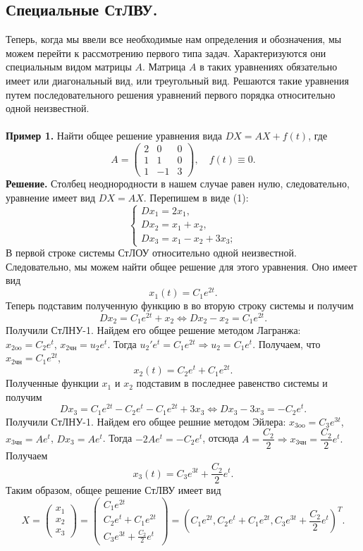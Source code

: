 \documentclass[a4paper, 12pt]{article}
\begin{document}
	\subsection*{Специальные СтЛВУ.}
	Теперь, когда мы ввели все необходимые нам определения и обозначения, мы можем перейти к рассмотрению первого типа задач. Характеризуются они специальным видом матрицы $A$. Матрица $A$ в таких уравнениях обязательно имеет или диагональный вид, или треугольный вид. Решаются такие уравнения путем последовательного решения уравнений первого порядка относительно одной неизвестной.\\\\
	\textbf{Пример 1.} Найти общее решение уравнения вида $DX = AX + f(t)$, где $$A = \begin{pmatrix}
		2 & 0 & 0\\
		1 & 1 & 0\\
		1 & -1 & 3
	\end{pmatrix},\quad f(t)\equiv 0.$$
	\textbf{Решение.} Столбец неоднородности в нашем случае равен нулю, следовательно, уравнение имеет вид $DX = AX$. Перепишем в виде (1):
	$$\begin{cases}
		Dx_1 = 2x_1,\\
		Dx_2 = x_1 + x_2,\\
		Dx_3 = x_1 - x_2 + 3x_3;
	\end{cases}$$
	В первой строке системы СтЛОУ относительно одной неизвестной. Следовательно, мы можем найти общее решение для этого уравнения. Оно имеет вид $$x_1(t) = C_1e^{2t}.$$
	Теперь подставим полученную функцию в во вторую строку системы и получим 
	$$Dx_2 = C_1e^{2t} + x_2 \Longleftrightarrow Dx_2 - x_2 = C_1e^{2t}.$$
	Получили СтЛНУ-1. Найдем его общее решение методом Лагранжа:\\ $x_{2\text{oo}} = C_2e^t$, $x_{2\text{чн}} = u_2e^t$. Тогда $u_2'e^t = C_1e^{2t} \Rightarrow u_2 = C_1e^t.$ Получаем, что $x_{2\text{чн}} = C_1e^{2t}$, $$x_{2}(t) = C_2e^t + C_1e^{2t}.$$
	Полученные функции $x_1$ и $x_2$ подставим в последнее равенство системы и получим
	$$Dx_3 = C_1e^{2t} - C_2e^t - C_1e^{2t} +3x_3 \Longleftrightarrow Dx_3 - 3x_3 = -C_2e^t.$$
	Получили СтЛНУ-1. Найдем его общее решние методом Эйлера:
	$x_{3\text{oo}} = C_3e^{3t}$, $x_{3\text{чн}} = Ae^t$, $Dx_3 = Ae^t$. Тогда $-2Ae^t = -C_2e^t$, отсюда $A = \dfrac{C_2}{2}\Rightarrow x_{3\text{чн}} = \dfrac{C_2}{2}e^t.$ Получаем
	$$x_3(t) = C_3e^{3t} + \dfrac{C_2}{2}e^t.$$
	Таким образом, общее решение СтЛВУ имеет вид $$X = \begin{pmatrix}
		x_1\\x_2\\x_3
	\end{pmatrix} = \begin{pmatrix}
	C_1e^{2t}\\ C_2e^t + C_1e^{2t}\\C_3e^{3t} + \frac{C_2}{2}e^t
\end{pmatrix} = (C_1e^{2t}, C_2e^t + C_1e^{2t}, C_3e^{3t} + \frac{C_2}{2}e^t)^T.$$
\end{document}
